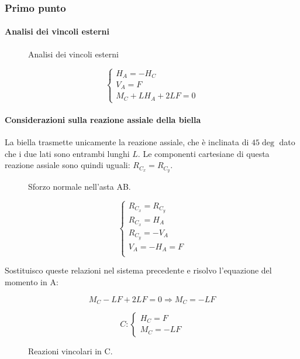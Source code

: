 \documentclass[main.tex]{subfiles}
\begin{document}
\subsubsection{Primo punto}

\paragraph{Analisi dei vincoli esterni}

\begin{figure}[H]
\centering
\resizebox{.5\textwidth}{!}{}
\caption{Analisi dei vincoli esterni}
\end{figure}

\[
\begin{cases}
	H_A = - H_C\\
	V_A = F\\
	M_C + LH_A + 2LF = 0
\end{cases}
\]

\paragraph{Considerazioni sulla reazione assiale della biella}
La biella trasmette unicamente la reazione assiale, che è inclinata di $45\deg$ dato che i due lati sono entrambi lunghi $L$. Le componenti cartesiane di questa reazione assiale sono quindi uguali: $R_{C_x} = R_{C_y}$.

\begin{figure}[H]
\centering
\resizebox{.5\textwidth}{!}{}
\caption{Sforzo normale nell'asta AB.}
\end{figure}

\[
\begin{cases}
	R_{C_x} = R_{C_y}\\
	R_{C_x} = H_A\\
	R_{C_y} = -V_A\\
	V_A = -H_A = F\\
\end{cases}
\]

Sostituisco queste relazioni nel sistema precedente e risolvo l'equazione del momento in A:

\[
	M_C - LF + 2LF = 0
	\Longrightarrow
	M_C = -LF
\]

\begin{figure}[H]
\centering
  \[
  	C: \begin{cases}
		H_C = F\\
		M_C = -LF
  	\end{cases}
  \]
  \caption{Reazioni vincolari in C.}
\end{figure}
\end{document}
